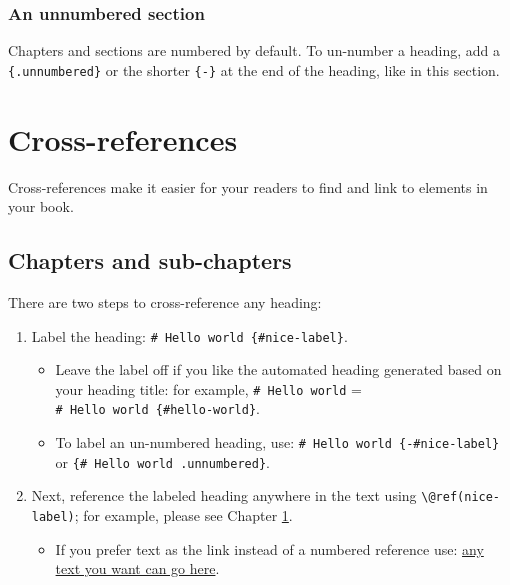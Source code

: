 \documentclass[
]{book}
\newenvironment{Shaded}{\begin{snugshade}}{\end{snugshade}}
\newcommand{\CommentTok}[1]{\textcolor[rgb]{0.56,0.35,0.01}{\textit{#1}}}
\newcommand{\FunctionTok}[1]{\textcolor[rgb]{0.13,0.29,0.53}{\textbf{#1}}}
\newcommand{\NormalTok}[1]{#1}
\newcommand{\OtherTok}[1]{\textcolor[rgb]{0.56,0.35,0.01}{#1}}
\newcommand{\SpecialCharTok}[1]{\textcolor[rgb]{0.81,0.36,0.00}{\textbf{#1}}}
\providecommand{\tightlist}{%
  \setlength{\itemsep}{0pt}\setlength{\parskip}{0pt}}
\theoremstyle{definition}
\theoremstyle{definition}
\theoremstyle{definition}
\theoremstyle{definition}
\theoremstyle{remark}
\begin{document}
\begin{Shaded}
\end{Shaded}

\subsection*{An unnumbered section}\label{an-unnumbered-section}

Chapters and sections are numbered by default. To un-number a heading, add a \texttt{\{.unnumbered\}} or the shorter \texttt{\{-\}} at the end of the heading, like in this section.

\chapter{Cross-references}\label{cross}

Cross-references make it easier for your readers to find and link to elements in your book.

\section{Chapters and sub-chapters}\label{chapters-and-sub-chapters}

There are two steps to cross-reference any heading:

\begin{enumerate}
\def\labelenumi{\arabic{enumi}.}
\tightlist
\item
  Label the heading: \texttt{\#\ Hello\ world\ \{\#nice-label\}}.

  \begin{itemize}
  \tightlist
  \item
    Leave the label off if you like the automated heading generated based on your heading title: for example, \texttt{\#\ Hello\ world} = \texttt{\#\ Hello\ world\ \{\#hello-world\}}.
  \item
    To label an un-numbered heading, use: \texttt{\#\ Hello\ world\ \{-\#nice-label\}} or \texttt{\{\#\ Hello\ world\ .unnumbered\}}.
  \end{itemize}
\item
  Next, reference the labeled heading anywhere in the text using \texttt{\textbackslash{}@ref(nice-label)}; for example, please see Chapter \ref{cross}.

  \begin{itemize}
  \tightlist
  \item
    If you prefer text as the link instead of a numbered reference use: \hyperref[cross]{any text you want can go here}.
  \end{itemize}
\end{enumerate}
\end{document}
